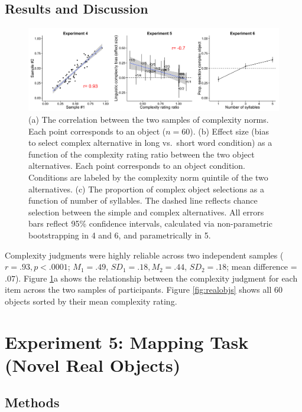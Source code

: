 \documentclass[man]{apa2}
\begin{document}
\subsection{Results and Discussion}

 \begin{figure} [t]
 \begin{center}
  \includegraphics[width=6in]{figures/study2_plots.png}
  \caption{\label{fig:study2_plots} (a) The correlation between the two samples of complexity norms. Each point corresponds to an object ($n = 60$). (b) Effect size (bias to select complex alternative in long vs.\ short word condition) as a function of the complexity rating ratio between the two object alternatives. Each point corresponds to an object condition. Conditions are labeled by the complexity norm quintile of the two alternatives. (c) The proportion of complex object selections as a function of number of syllables. The dashed line reflects chance selection between the simple and complex alternatives. All errors bars reflect 95\% confidence intervals, calculated via non-parametric bootstrapping in 4 and 6, and parametrically in 5.}
 \end{center}
\end{figure}
 Complexity judgments were highly reliable across two independent samples ($r = .93, p < .0001$; $M_1 = .49$, $SD_1 = .18, M_2 = .44$, $SD_2 = .18$; mean difference = $.07$). Figure \ref{fig:study2_plots}a shows the relationship between the complexity judgment for each item across the two samples of participants. Figure \ref{fig:realobjs} shows all 60 objects sorted by their mean complexity rating.

\section{Experiment 5: Mapping Task (Novel Real Objects)}

\subsection{Methods}
\end{document}
